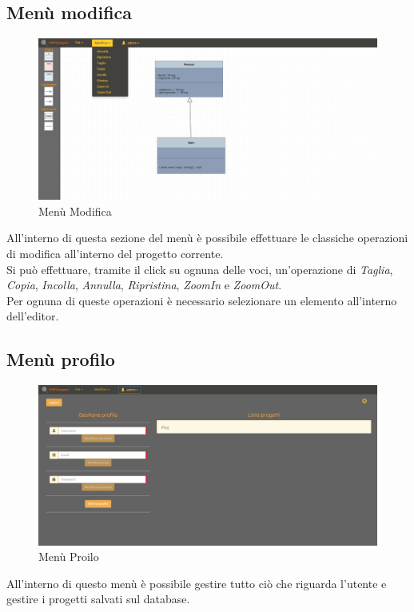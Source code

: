 	\subsection{Menù modifica}
		\begin{figure}[H]
			\centering
				\includegraphics[width=1\linewidth]{res/img/menuModifica.png}
			\caption{Menù Modifica}
		\end{figure}
		All'interno di questa sezione del menù è possibile effettuare le classiche operazioni di modifica all'interno del progetto corrente.\\
		Si può effettuare, tramite il click su ognuna delle voci, un'operazione di \emph{Taglia}, \emph{Copia}, \emph{Incolla}, \emph{Annulla}, \emph{Ripristina}, \emph{ZoomIn} e \emph{ZoomOut}.\\
		Per ognuna di queste operazioni è necessario selezionare un elemento all'interno dell'editor.\\
	\subsection{Menù profilo}
		\begin{figure}[H]
			\centering
				\includegraphics[width=1\linewidth]{res/img/menuProfilo.png}
			\caption{Menù Proilo}
		\end{figure}
		All'interno di questo menù è possibile gestire tutto ciò che riguarda l'utente e gestire i progetti salvati sul database.
